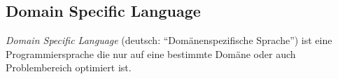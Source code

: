 \subsection{Domain Specific Language}
\label{sec:dsl}

\emph{Domain Specific Language} (deutsch: \enquote{Domänenspezifische Sprache}) ist eine Programmiersprache die nur auf eine bestimmte Domäne oder auch Problembereich optimiert ist.